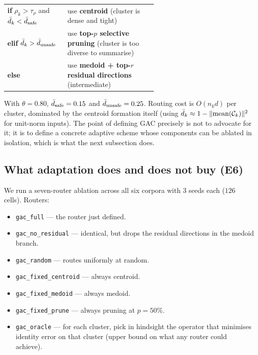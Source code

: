 \begin{center}
\renewcommand{\arraystretch}{1.15}
\begin{tabular}{lp{0.6\linewidth}}
\toprule
\textbf{if} $\rho_k > \tau_\rho$ and $\bar{d}_k < \bar{d}_{\mathrm{safe}}$ & use \textbf{centroid}
(cluster is dense and tight) \\
\textbf{elif} $\bar{d}_k > \bar{d}_{\mathrm{unsafe}}$ & use \textbf{top-$p$ selective pruning}
(cluster is too diverse to summarise) \\
\textbf{else} & use \textbf{medoid + top-$r$ residual directions}
(intermediate) \\
\bottomrule
\end{tabular}
\end{center}

With $\theta = 0.80$, $\bar{d}_{\mathrm{safe}} = 0.15$ and
$\bar{d}_{\mathrm{unsafe}} = 0.25$. Routing cost is $O(n_k d)$ per
cluster, dominated by the centroid formation itself (using $\bar{d}_k
\approx 1 - \|\mathrm{mean}(\mathcal{C}_k)\|^2$ for unit-norm inputs).
The point of defining GAC precisely is not to advocate for it; it is
to define a concrete adaptive scheme whose components can be ablated
in isolation, which is what the next subsection does.

\subsection{What adaptation does and does not buy (E6)}
\label{sec:gac:ablation}

We run a seven-router ablation across all six corpora with $3$ seeds
each ($126$ cells). Routers:

\begin{itemize}[leftmargin=1.8em, itemsep=2pt]
\item \texttt{gac\_full} --- the router just defined.
\item \texttt{gac\_no\_residual} --- identical, but drops the residual
directions in the medoid branch.
\item \texttt{gac\_random} --- routes uniformly at random.
\item \texttt{gac\_fixed\_centroid} --- always centroid.
\item \texttt{gac\_fixed\_medoid} --- always medoid.
\item \texttt{gac\_fixed\_prune} --- always pruning at $p = 50\%$.
\item \texttt{gac\_oracle} --- for each cluster, pick in hindsight the
operator that minimises identity error on that cluster (upper bound
on what any router could achieve).
\end{itemize}

